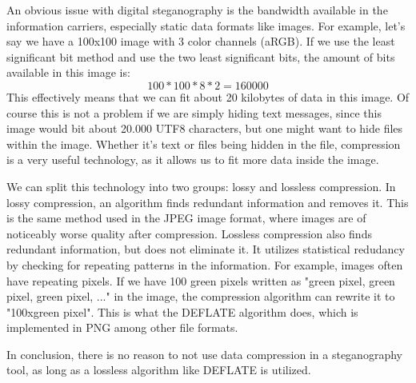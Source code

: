 An obvious issue with digital steganography is the bandwidth available in the information carriers, especially static data formats like images. For example, let's say we have a 100x100 image with 3 color channels (aRGB). If we use the least significant bit method and use the two least significant bits, the amount of bits available in this image is:
\begin{equation}100*100*8*2=160000\end{equation}
This effectively means that we can fit about 20 kilobytes of data in this image. Of course this is not a problem if we are simply hiding text messages, since this image would bit about 20.000 UTF8 characters, but one might want to hide files within the image. Whether it's text or files being hidden in the file, compression is a very useful technology, as it allows us to fit more data inside the image.

We can split this technology into two groups: lossy and lossless compression. In lossy compression, an algorithm finds redundant information and removes it. This is the same method used in the JPEG image format, where images are of noticeably worse quality after compression. Lossless compression also finds redundant information, but does not eliminate it. It utilizes statistical redudancy by checking for repeating patterns in the information. For example, images often have repeating pixels. If we have 100 green pixels written as "green pixel, green pixel, green pixel, ..." in the image, the compression algorithm can rewrite it to "100xgreen pixel". This is what the DEFLATE algorithm does, which is implemented in PNG among other file formats.\cite{deflate}

In conclusion, there is no reason to not use data compression in a steganography tool, as long as a lossless algorithm like DEFLATE is utilized. 